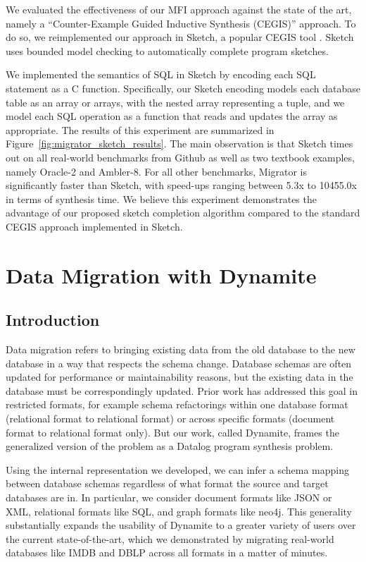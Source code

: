 \documentclass[]{article}
\begin{document}
                We evaluated the effectiveness of our MFI approach against the state of the art, namely a  ``Counter-Example Guided Inductive Synthesis (CEGIS)'' approach. To do so, we reimplemented our approach in Sketch, a popular CEGIS tool \cite{sketch}. Sketch uses bounded model checking to automatically complete program sketches. 

                We implemented the semantics of SQL in Sketch by encoding each SQL statement as a C function. Specifically, our Sketch encoding models each database table as an array or arrays, with the nested array representing a tuple, and we model each SQL operation as a function that reads and updates the array as appropriate. The results of this experiment are summarized in Figure~\ref{fig:migrator_sketch_results}. The main observation is that Sketch times out on all real-world benchmarks from Github as well as two textbook examples, namely Oracle-2 and Ambler-8. For all other benchmarks, Migrator is significantly faster than Sketch, with speed-ups ranging between 5.3x to 10455.0x in terms of synthesis time. We believe this experiment demonstrates the advantage of our proposed sketch completion algorithm compared to the standard CEGIS approach implemented in Sketch. 



    \section{Data Migration with Dynamite}

        \subsection{Introduction}

            Data migration refers to bringing existing data from the old database to the new database in a way that respects the schema change. Database schemas are often updated for performance or maintainability reasons, but the existing data in the database must be correspondingly updated. Prior work has addressed this goal in restricted formats, for example schema refactorings within one database format (relational format to relational format) or across specific formats (document format to relational format only). But our work, called Dynamite, frames the generalized version of the problem as a Datalog program synthesis problem. 

            Using the internal representation we developed, we can infer a schema mapping between database schemas regardless of what format the source and target databases are in. In particular, we consider document formats like JSON or XML, relational formats like SQL, and graph formats like neo4j. This generality substantially expands the usability of Dynamite to a greater variety of users over the current state-of-the-art, which we demonstrated by migrating real-world databases like IMDB and DBLP across all formats in a matter of minutes.
\end{document}

